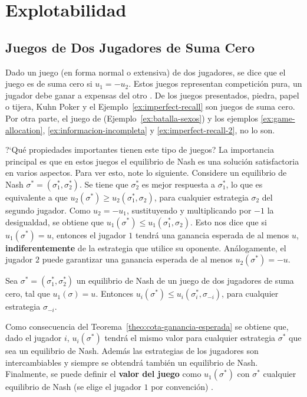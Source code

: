 \chapter{Explotabilidad}
\label{chapter:explotabilidad}

\section{Juegos de Dos Jugadores de Suma Cero}
\label{section:dos-jugadores-suma-cero}
Dado un juego (en forma normal o extensiva) de dos jugadores, se dice que el juego es de suma cero si $u_1 = -u_2$. Estos juegos representan competición pura, un jugador debe ganar a expensas del otro \cite[p.~5]{bib:handbook-blai}. De los juegos presentados, piedra, papel o tijera, Kuhn Poker y el Ejemplo~\ref{ex:imperfect-recall} son juegos de suma cero. Por otra parte, el juego de  (Ejemplo~\ref{ex:batalla-sexos}) y los  ejemplos \ref{ex:game-allocation}, \ref{ex:informacion-incompleta} y \ref{ex:imperfect-recall-2}, no lo son.

?`Qué propiedades importantes tienen este tipo de juegos? La importancia principal es que en estos juegos el equilibrio de Nash es una solución satisfactoria en varios aspectos. Para ver esto, note lo siguiente. Considere un equilibrio de Nash $\sigma^* = (\sigma^*_1, \sigma^*_2)$. Se tiene que $\sigma^*_2$ es mejor respuesta a $\sigma^*_1$, lo que es equivalente a que $u_2(\sigma^*) \geq u_2(\sigma^*_1, \sigma_2)$, para cualquier estrategia $\sigma_2$ del segundo jugador. Como $u_2 = -u_1$, sustituyendo y multiplicando por $-1$ la desigualdad, se obtiene que $u_1(\sigma^*) \leq u_1(\sigma^*_1, \sigma_2)$. Esto nos dice que si $u_1(\sigma^*) = u$, entonces el jugador $1$ tendrá una ganancia esperada de al menos $u$, \textbf{indiferentemente} de la estrategia que utilice su oponente. Análogamente, el jugador $2$ puede garantizar una ganancia esperada de al menos $u_2(\sigma^*) = -u$.

\begin{theorem}
\label{theo:cota-ganancia-esperada}
Sea $\sigma^* = (\sigma^*_1, \sigma^*_2)$ un equilibrio de Nash de un juego de dos jugadores de suma cero, tal que $u_1(\sigma) = u$. Entonces $u_i(\sigma^*) \leq u_i(\sigma^*_i, \sigma_{-i})$, para cualquier estrategia $\sigma_{-i}$.  
\end{theorem}

Como consecuencia del Teorema~\ref{theo:cota-ganancia-esperada} se obtiene que, dado el jugador $i$, $u_i(\sigma^*)$ tendrá el mismo valor para cualquier estrategia $\sigma^*$ que sea un equilibrio de Nash. Además las estrategias de los jugadores son intercambiables y siempre se obtendrá también un equilibrio de Nash. Finalmente, se puede definir el \textbf{valor del juego} \cite[p.~17]{bib:handbook-blai} como $u_1(\sigma^*)$ con $\sigma^*$ cualquier equilibrio de Nash (se elige el jugador $1$ por convención) .

